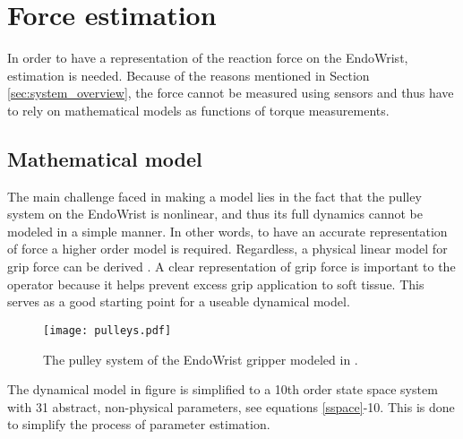 \section{Force estimation}
In order to have a representation of the reaction force on the EndoWrist, estimation is needed.
Because of the reasons mentioned in Section \ref{sec:system_overview}, the force cannot be measured using sensors and thus have to rely on mathematical models as functions of torque measurements.


\subsection{Mathematical model}
The main challenge faced in making a model lies in the fact that the pulley system on the EndoWrist is nonlinear, and thus its full dynamics cannot be modeled in a simple manner. In other words, to have an accurate representation of force a higher order model is required.
Regardless, a physical linear model for grip force can be derived \cite{kim2014dynamic}.
A clear representation of grip force is important to the operator because it helps prevent excess grip application to soft tissue.
This serves as a good starting point for a useable dynamical model.


\begin{figure}
\centering
\texttt{[image: pulleys.pdf]}
\caption{The pulley system of the EndoWrist gripper modeled in \cite{kim2014dynamic}.}
\label{fig:pully}
\end{figure}






The dynamical model in figure \cite{kim2014dynamic} is simplified to a 10th order state space system with 31 abstract, non-physical parameters, see equations \ref{sspace}-10.
This is done to simplify the process of parameter estimation.




